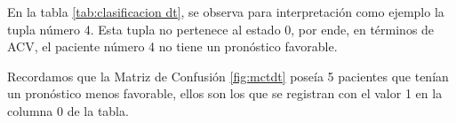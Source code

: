 \begin{table}[H]
\centering
\setlength{\tabcolsep}{10pt}
\caption{Predicciones probabilísticas con clasificación final Decision Tree}
\label{tab:clasificacion dt}
\end{table}
        
	En la tabla \ref{tab:clasificacion dt}, se observa para interpretación como ejemplo la tupla número 4. Esta tupla no pertenece al estado 0, por ende, en términos de ACV, el paciente número 4 no tiene un pronóstico favorable. 
\par Recordamos que la Matriz de Confusión \ref{fig:mctdt} poseía 5 pacientes que tenían un pronóstico menos favorable, ellos son los que se registran con el valor 1 en la columna 0 de la tabla.

